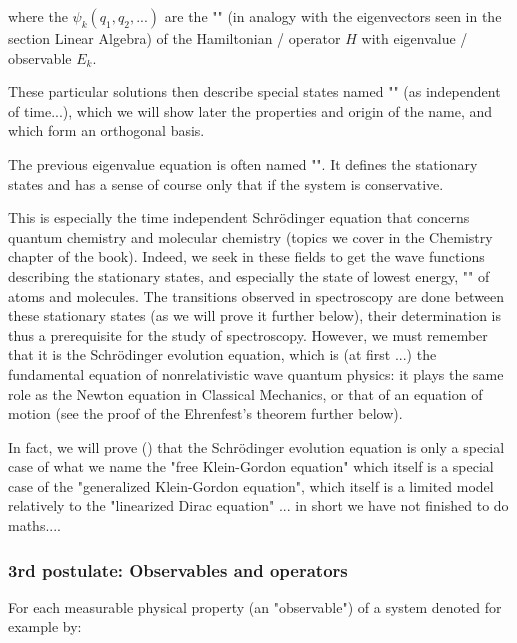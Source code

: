 	where the $\psi_k(q_1,q_2,...)$ are the "" (in analogy with the eigenvectors seen in the section Linear Algebra) of the Hamiltonian / operator $H$ with eigenvalue / observable $E_k$.
	
	These particular solutions then describe special states named "" (as independent of time...), which we will show later the properties and origin of the name, and which form an orthogonal basis.
	
	The previous eigenvalue equation is often named "". It defines the stationary states and has a sense of course only that if the system is conservative.
	
	This is especially the time independent Schrödinger equation that concerns quantum chemistry and molecular chemistry (topics we cover in the Chemistry chapter of the book). Indeed, we seek in these fields to get the wave functions describing the stationary states, and especially the state of lowest energy, "" of atoms and molecules. The transitions observed in spectroscopy are done between these stationary states (as we will prove it further below), their determination is thus a prerequisite for the study of spectroscopy. However, we must remember that it is the Schrödinger evolution equation, which is (at first ...) the fundamental equation of nonrelativistic wave quantum physics: it plays the same role as the Newton equation in Classical Mechanics, or that of an equation of motion (see the proof of the  Ehrenfest's theorem further below).
	\begin{tcolorbox}[title=Remark,colframe=black,arc=10pt]
	In fact, we will prove () that the Schrödinger evolution equation is only a special case of what we name the "free Klein-Gordon equation" which itself is a special case of the "generalized Klein-Gordon equation", which itself is a limited model relatively to the "linearized Dirac equation" ... in short we have not finished to do maths....
	\end{tcolorbox}
	
	\subsubsection{3rd postulate: Observables and operators}
	For each measurable physical property (an "observable") of a system denoted for example by:
	

